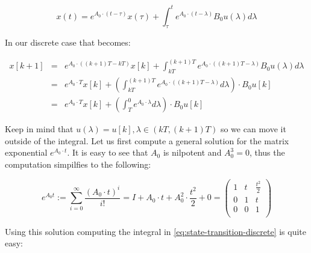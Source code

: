 \documentclass[english,ngerman]{KITreprt}
\begin{document}
\begin{equation}
x(t) = e^{A_0 \cdot (t - \tau)} x(\tau) + \int^t_\tau e^{A_0 \cdot (t - \lambda)} B_0 u(\lambda) d\lambda
\end{equation}

In our discrete case that becomes:

\begin{eqnarray} \label{eq:state-transition-discrete}
x[k+1] & = & e^{A_0 \cdot ((k+1)T - kT)} x[k] + \int^{(k+1)T}_{kT} e^{A_0 \cdot ((k+1)T - \lambda)} B_0 u(\lambda) d\lambda \\
       & = & e^{A_0 \cdot T} x[k] + \left(\int^{(k+1)T}_{kT} e^{A_0 \cdot ((k+1)T - \lambda)} d\lambda \right) \cdot B_0 u[k]\\
       & = & e^{A_0 \cdot T} x[k] + \left(\int^{0}_{T} e^{A_0 \cdot \lambda} d\lambda\right) \cdot B_0 u[k]
\end{eqnarray}

Keep in mind that $u(\lambda) = u[k], \lambda \in (kT, (k+1)T)$ so we
can move it outside of the integral. Let us first compute a general
solution for the matrix exponential $e^{A_0 \cdot t}$. It is easy to see
that $A_0$ is nilpotent and $A_0^3 = 0$, thus the computation simpilfies
to the following:

\begin{equation}
e^{A_0 t} := \sum^{\infty}_{i=0} \frac{(A_0 \cdot t)^i}{i!} = I + A_0 \cdot t + A_0^2 \cdot \frac{t^2}{2} + 0
=
\left(\begin{array}{ccc}
1 & t & \frac{t^2}{2}\\
0 & 1 & t \\
0 & 0 & 1 \\
\end{array}\right)
\end{equation}

Using this solution computing the integral in
\ref{eq:state-transition-discrete} is quite easy:
\end{document}

